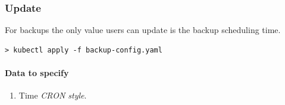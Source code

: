 \subsubsection*{Update}

For backups the only value users can update is the backup 
scheduling time.

\begin{lstlisting}
> kubectl apply -f backup-config.yaml
\end{lstlisting}

\paragraph{Data to specify}
\begin{enumerate}
	\item Time \textit{CRON style}.
\end{enumerate}
